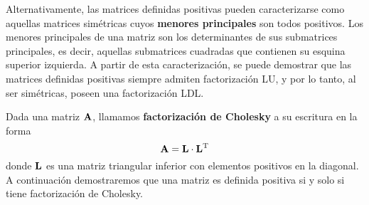 Alternativamente, las matrices definidas positivas pueden caracterizarse como
aquellas matrices simétricas cuyos \textbf{menores
principales} son todos positivos. Los menores principales de una matriz
son los determinantes de sus submatrices principales, es decir,
aquellas submatrices cuadradas que contienen su esquina superior izquierda.
A partir de esta caracterización, se puede demostrar que las matrices
definidas positivas siempre admiten factorización LU, y por lo tanto,
al ser simétricas, poseen una factorización LDL.

Dada una matriz $\mathbf{A}$, llamamos \textbf{factorización de Cholesky} a su
escritura en la forma
\[ \mathbf{A} = \mathbf{L} \cdot \mathbf{L}^{\mathrm{T}} \]
donde $\mathbf{L}$ es una matriz triangular inferior con elementos positivos
en la diagonal. A continuación demostraremos que una matriz es
definida positiva si y solo si tiene factorización de Cholesky.

